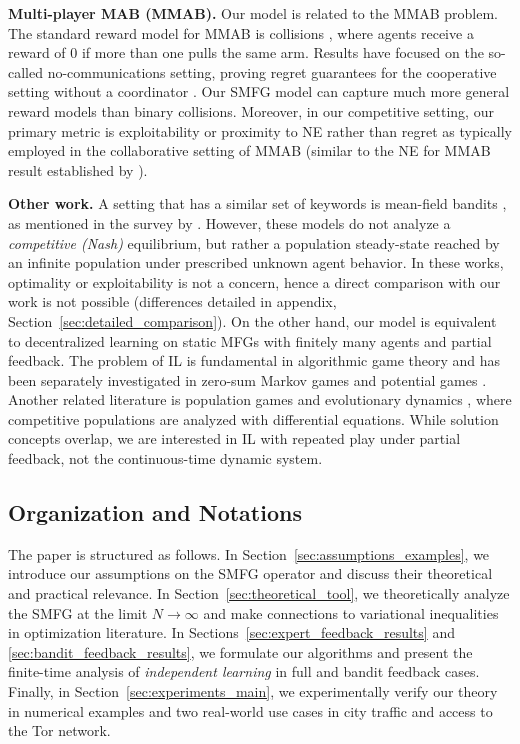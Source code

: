 \textbf{Multi-player MAB (MMAB).}
Our model is related to the MMAB problem.
The standard reward model for MMAB is collisions \citep{anandkumar2011distributed}, where agents receive a reward of 0 if more than one pulls the same arm.
Results have focused on the so-called no-communications setting, proving regret guarantees for the cooperative setting without a coordinator \citep{avner2014concurrent,rosenski2016multi, bubeck2021cooperative}.
Our SMFG model can capture much more general reward models than binary collisions.
Moreover, in our competitive setting, our primary metric is exploitability or proximity to NE rather than regret as typically employed in the collaborative setting of MMAB (similar to the NE for MMAB result established by \citet{lugosi2022multiplayer}).

\textbf{Other work.}
A setting that has a similar set of keywords is mean-field bandits \citep{gummadi2013mean,wang2021mean}, as mentioned in the survey by \citet{lauriere2022learning}.
However, these models do not analyze a \emph{competitive (Nash)} equilibrium, but rather a population steady-state reached by an infinite population under prescribed unknown agent behavior.
In these works, optimality or exploitability is not a concern, hence a direct comparison with our work is not possible (differences detailed in appendix, Section~\ref{sec:detailed_comparison}).
On the other hand, our model is equivalent to decentralized learning on static MFGs \citep{lauriere2022learning} with finitely many agents and partial feedback.
The problem of IL is fundamental in algorithmic game theory and has been separately investigated in zero-sum Markov games \citep{daskalakis2020independent, sayin2021decentralized, ozdaglar2021independent} and potential games \citep{ding2022independent, heliou2017learning,alatur2024independent}.
Another related literature is population games and evolutionary dynamics \citep{sandholm2015population, quijano2017role}, where competitive populations are analyzed with differential equations.
While solution concepts overlap, we are interested in IL with repeated play under partial feedback, not the continuous-time dynamic system.


\subsection{Organization and Notations}
The paper is structured as follows.  In Section~\ref{sec:assumptions_examples}, we introduce our assumptions on the SMFG operator and discuss their theoretical and practical relevance.
In Section~\ref{sec:theoretical_tool}, we theoretically analyze the SMFG at the limit $N\rightarrow\infty$ and make connections to variational inequalities in optimization literature.
In Sections~\ref{sec:expert_feedback_results} and \ref{sec:bandit_feedback_results}, we formulate our algorithms and present the finite-time analysis of \emph{independent learning} in full and bandit feedback cases.
Finally, in Section~\ref{sec:experiments_main}, we experimentally verify our theory in numerical examples and two real-world use cases in city traffic and access to the Tor network. 


